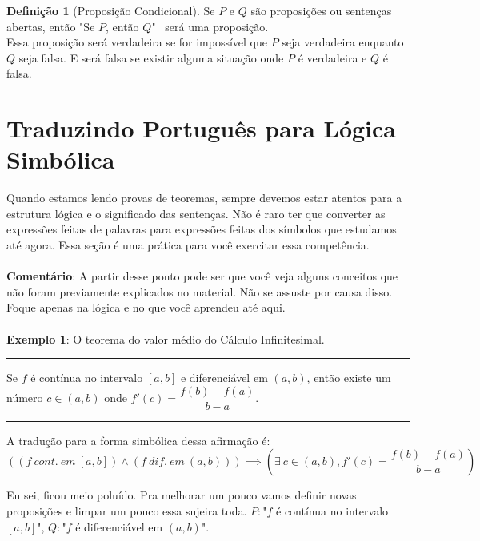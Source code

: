 \documentclass[a4paper,11pt]{book}
\theoremstyle{definition}
\theoremstyle{break}
\newtheorem{definition}{Definição}[section]
\begin{document}
\begin{definition}[Proposição Condicional]
Se $P$ e $Q$ são proposições ou sentenças abertas, então "Se $P$, então $Q$" \  será uma proposição.\\
Essa proposição será verdadeira se for impossível que $P$ seja verdadeira enquanto $Q$ seja falsa. E será falsa se existir alguma situação onde $P$ é verdadeira e $Q$ é falsa.
\end{definition}

\section{Traduzindo Português para Lógica Simbólica}

Quando estamos lendo provas de teoremas, sempre devemos estar atentos para a estrutura lógica e o significado das sentenças. Não é raro ter que converter as expressões feitas de palavras para expressões feitas dos símbolos que estudamos até agora. Essa seção é uma prática para você exercitar essa competência.
\\
\\
\textbf{Comentário}: A partir desse ponto pode ser que você veja alguns conceitos que não foram previamente explicados no material. Não se assuste por causa disso. Foque apenas na lógica e no que você aprendeu até aqui.
\\
\\
\textbf{Exemplo 1}: O teorema do valor médio do Cálculo Infinitesimal.
\\
\hrule
\vspace{5pt}
Se $f$ é contínua no intervalo $[a,b]$ e diferenciável em $(a,b)$, então existe um número $c \in (a,b)$ onde $f'(c) = \dfrac{f(b) - f(a)}{b - a}$.
\vspace{5pt}
\hrule
\vspace{5pt}
A tradução para a forma simbólica dessa afirmação é:
$$ \left( (f \ cont. \ em \  [a,b]) \land (f \ dif. \ em \  (a,b)) \right) \implies \left(\exists \ c \in (a,b), f'(c) = \dfrac{f(b) - f(a)}{b - a} \right) $$

Eu sei, ficou meio poluído. Pra melhorar um pouco vamos definir novas proposições e limpar um pouco essa sujeira toda. $P : $"$f$ é contínua no intervalo $[a,b]$", $Q : $"$f$ é diferenciável em $(a,b)$".
\end{document}
